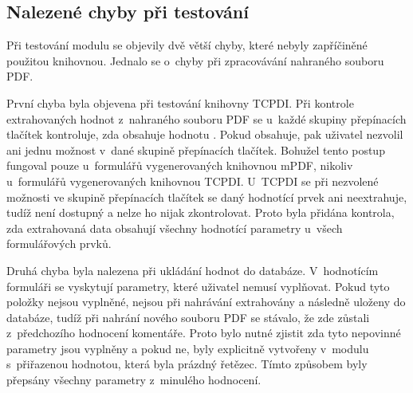 \subsection{Nalezené chyby při testování}
\label{subsec:chyby_pri_testovani}
Při testování modulu se objevily dvě větší chyby, které nebyly zapříčiněné použitou knihovnou. Jednalo se o~chyby při zpracovávání nahraného souboru PDF.
\par
První chyba byla objevena při testování knihovny TCPDI. Při kontrole extrahovaných hodnot z~nahraného souboru PDF se u~každé skupiny přepínacích tlačítek kontroluje, zda obsahuje hodnotu . Pokud obsahuje, pak uživatel nezvolil ani jednu možnost v~dané skupině přepínacích tlačítek. Bohužel tento postup fungoval pouze u~formulářů vygenerovaných knihovnou mPDF, nikoliv u~formulářů vygenerovaných knihovnou TCPDI. U~TCPDI se při nezvolené možnosti ve skupině přepínacích tlačítek se daný hodnotící prvek ani neextrahuje, tudíž není dostupný a nelze ho nijak zkontrolovat. Proto byla přidána kontrola, zda extrahovaná data obsahují všechny hodnotící parametry u~všech formulářových prvků.
\par
Druhá chyba byla nalezena při ukládání hodnot do databáze. V~hodnotícím formuláři se vyskytují parametry, které uživatel nemusí vyplňovat. Pokud tyto položky nejsou vyplněné, nejsou při nahrávání extrahovány a následně uloženy do databáze, tudíž při nahrání nového souboru PDF se stávalo, že zde zůstali z~předchozího hodnocení komentáře. Proto bylo nutné zjistit zda tyto nepovinné parametry jsou vyplněny a pokud ne, byly explicitně vytvořeny v~modulu s~přiřazenou hodnotou, která byla prázdný řetězec. Tímto způsobem byly přepsány všechny parametry z~minulého hodnocení.


